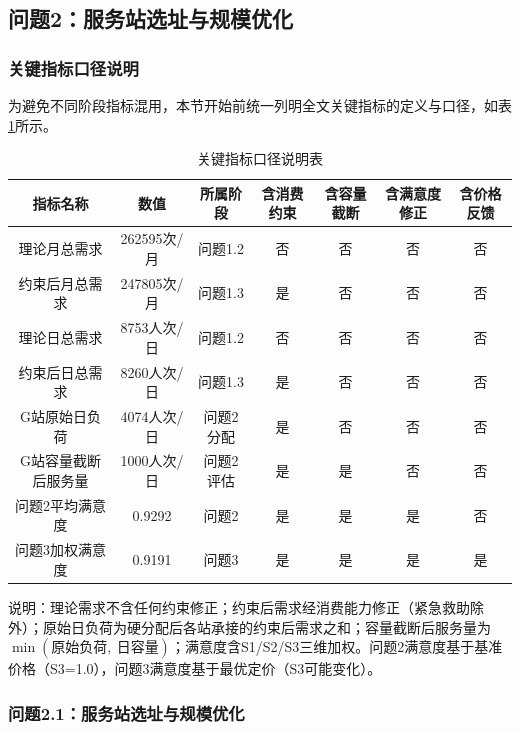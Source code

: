 \documentclass[UTF8]{ctexart}
\begin{document}
\subsection{问题2：服务站选址与规模优化}

\subsubsection{关键指标口径说明}

为避免不同阶段指标混用，本节开始前统一列明全文关键指标的定义与口径，如表\ref{tab:indicator_def}所示。

\begin{table}[H]
\centering
\caption{关键指标口径说明表}
\label{tab:indicator_def}
\renewcommand{\arraystretch}{1.2}
{\small
\begin{tabular}{|c|c|c|c|c|c|c|}
\hline
\textbf{指标名称} & \textbf{数值} & \textbf{所属阶段} & \textbf{含消费约束} & \textbf{含容量截断} & \textbf{含满意度修正} & \textbf{含价格反馈} \\
\hline
理论月总需求 & 262595次/月 & 问题1.2 & 否 & 否 & 否 & 否 \\
\hline
约束后月总需求 & 247805次/月 & 问题1.3 & 是 & 否 & 否 & 否 \\
\hline
理论日总需求 & 8753人次/日 & 问题1.2 & 否 & 否 & 否 & 否 \\
\hline
约束后日总需求 & 8260人次/日 & 问题1.3 & 是 & 否 & 否 & 否 \\
\hline
G站原始日负荷 & 4074人次/日 & 问题2分配 & 是 & 否 & 否 & 否 \\
\hline
G站容量截断后服务量 & 1000人次/日 & 问题2评估 & 是 & 是 & 否 & 否 \\
\hline
问题2平均满意度 & 0.9292 & 问题2 & 是 & 是 & 是 & 否 \\
\hline
问题3加权满意度 & 0.9191 & 问题3 & 是 & 是 & 是 & 是 \\
\hline
\end{tabular}
}
\end{table}

说明：理论需求不含任何约束修正；约束后需求经消费能力修正（紧急救助除外）；原始日负荷为硬分配后各站承接的约束后需求之和；容量截断后服务量为 $\min(\text{原始负荷},\ \text{日容量})$；满意度含S1/S2/S3三维加权。问题2满意度基于基准价格（S3=1.0），问题3满意度基于最优定价（S3可能变化）。

\subsubsection{问题2.1：服务站选址与规模优化}
\end{document}
